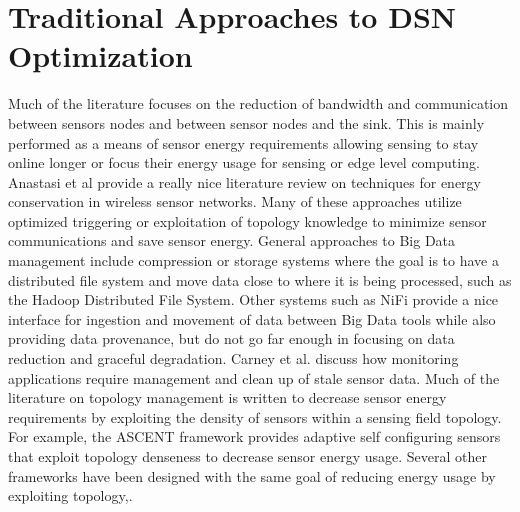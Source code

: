 %
%
%

\section{Traditional Approaches to DSN Optimization}
Much of the literature focuses on the reduction of bandwidth and communication between sensors nodes and between sensor nodes and the sink. This is mainly performed as a means of sensor energy requirements allowing sensing to stay online longer or focus their energy usage for sensing or edge level computing. Anastasi et al\cite{anastasi_energy_2009} provide a really nice literature review on techniques for energy conservation in wireless sensor networks. Many of these approaches utilize optimized triggering\cite{alippi_adaptive_2010} or exploitation of topology knowledge\cite{warrier2007much} to minimize sensor communications and save sensor energy.  General approaches to Big Data management include compression\cite{tang2004compression} or storage systems where the goal is to have a distributed file system and move data close to where it is being processed, such as the Hadoop Distributed File System\cite{warrier2007much}. Other systems such as NiFi\cite{hughes2016survey} provide a nice interface for ingestion and movement of data between Big Data tools while also providing data provenance, but do not go far enough in focusing on data reduction and graceful degradation. Carney et al.\cite{carney2002monitoring} discuss how monitoring applications require management and clean up of stale sensor data. Much of the literature on topology management is written to decrease sensor energy requirements by exploiting the density of sensors within a sensing field topology. For example, the ASCENT\cite{cerpa2004ascent} framework provides adaptive self configuring sensors that exploit topology denseness to decrease sensor energy usage. Several other frameworks have been designed with the same goal of reducing energy usage by exploiting topology\cite{schurgers2002stem},\cite{schurgers2002topology}.

